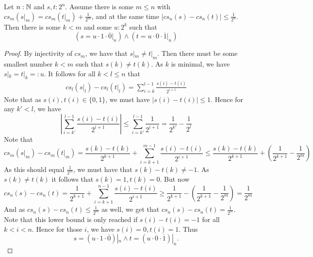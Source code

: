 \begin{lemma}\label{CauchyApproxLemma}
  Let $n:\mathbb{N}$ and  $s,t:2^n$. Assume there is some $ m \leq n$ with $cs_m(s|_m) = cs_m(t|_m) + \frac{1}{2^m}$, and 
  at the same time $|cs_n(s) -cs_n(t) |\leq \frac{1}{2^n}$. 
  Then there is some $k< m$ and some $u:2^k$ such that 
  \begin{equation}
    (s = u \cdot 1 \cdot \overline 0|_n)
    \wedge 
    (t = u \cdot 0 \cdot \overline 1|_n)
  \end{equation}
\end{lemma}
\begin{proof}
  By injectivity of $cs_m$, we have that $s|_m \neq t|_m$. 
  Then there must be some smallest number $k<m$ such that 
  $s(k) \neq t(k)$. As $k$ is minimal, we have $s|_k = t|_k = : u$. 
  It follows for all $k<l\leq n$ that 
  \begin{align}
    cs_l(s|_l)-cs_l(t|_l) 
    = \sum\limits_{i = k}^{l-1} \frac{s(i)-t(i)}{2^{i+1}}
  \end{align}
  Note that as $s(i),t(i) \in \{0,1\}$, we must have %
  $|s(i)-t(i)| \leq 1$. 
  Hence for any $k'<l$, we have 
  \begin{equation}
    |\sum\limits_{i = k'}^{l-1} \frac{s(i)-t(i)}{2^{i+1}}|
    \leq 
    \sum\limits_{i = k'}^{l-1} \frac{1}{2^{i+1}}
    = 
    \frac{1}{2^{k'}} - \frac{1}{2^{l}}
  \end{equation}
  Note that 
  \begin{equation}
    cs_m(s|_m) -cs_m(t|_m) 
    =
    \frac{s(k)-t(k)}{2^{k+1}} + \sum\limits_{i = k+1}^{m-1} \frac{s(i)-t(i)}{2^{i+1}}
    \leq 
    \frac{s(k)-t(k)}{2^{k+1}} + (\frac{1}{2^{k+1}} - \frac{1}{2^{m}})
  \end{equation}
  As this should equal $\frac{1}{2^m}$, we must have that $s(k)-t(k) \neq -1$. 
  As $s(k) \neq t(k)$ it follows that $s(k) = 1, t(k) = 0$.
  But now 
  \begin{equation}
    cs_n(s) -cs_n(t) 
    =
    \frac{1}{2^{k+1}} + \sum\limits_{i = k+1}^{n-1} \frac{s(i)-t(i)}{2^{i+1}}
    \geq 
    \frac{1}{2^{k+1}} - (\frac{1}{2^{k+1}} - \frac{1}{2^m} )
    =
    \frac{1}{2^{m}}
  \end{equation}
  And as $cs_n(s)-cs_n(t) \leq \frac{1}{2^m}$ as well, we get that 
  $cs_n(s)-cs_n(t) = \frac{1}{2^m}$. 
  Note that this lower bound is only reached if $s(i)-t(i) = -1$ for all $k<i<n$. 
  Hence for those $i$, we have $s(i) = 0, t(i) = 1$. 
  Thus 
  \begin{equation}
    s = (u \cdot 1\cdot \overline 0) |_n \wedge 
    t = (u \cdot 0\cdot \overline 1) |_n.
  \end{equation}
\end{proof}

